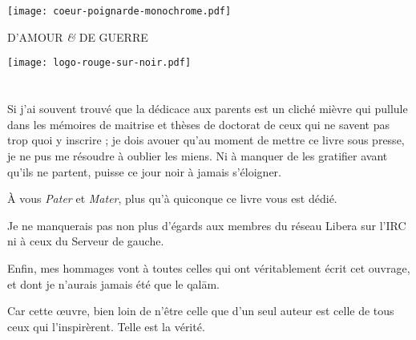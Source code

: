 \documentclass[a5paper,10pt,twoside,french]{book}
\begin{document}
{
\thispagestyle{empty}
\chapter*{}
\thispagestyle{empty}

  \null\vfill           %
    \begin{center}
      \texttt{[image: coeur-poignarde-monochrome.pdf]}
 
      \LARGE {D’AMOUR \emph{\&} DE GUERRE}

      \vspace*{20pt}

      \large { \texttt{[image: logo-rouge-sur-noir.pdf]} }
    \end{center}
    \vspace*{150pt}
  \vfill                %

}
{
\thispagestyle{empty}
\chapter*{}
\thispagestyle{empty}

  \null\vfill           %

    \begin{flushright}
      \begin{minipage}[t]{0.6\textwidth}%
        \em
        \small

        Si j’ai souvent trouvé que la dédicace aux parents est un cliché mièvre qui pullule dans les mémoires de maitrise et thèses de doctorat de ceux qui ne savent pas trop quoi y inscrire ; je dois avouer qu’au moment de mettre ce livre sous presse, je ne pus me résoudre à oublier les miens. Ni à manquer de les gratifier avant qu’ils ne partent, puisse ce jour noir à jamais s’éloigner.

        À vous \emph{Pater} et \emph{Mater}, plus qu’à quiconque ce livre vous est dédié.

        Je ne manquerais pas non plus d’égards aux membres du réseau Libera sur l’IRC ni à ceux du Serveur de gauche.

        Enfin, mes hommages vont à toutes celles qui ont véritablement écrit cet ouvrage, et dont je n’aurais jamais été que le qalām.

        Car cette œuvre, bien loin de n’être celle que d’un seul auteur est celle de tous ceux qui l’inspirèrent. Telle est la vérité.
      \end{minipage}%
    \end{flushright}

  \null\vfill\null                %
}
\end{document}
